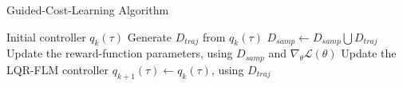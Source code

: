 \begin{algorithm}[htbp]
\caption{Guided-Cost-Learning Algorithm \cite{finn2016guided_cost_learning}}
\label{alg:guided_cost_learning}
\begin{algorithmic}
\Require Initial controller $q_{k}(\tau)$ 
    \State Generate $D_{traj}$ from $q_{k}(\tau)$
    \State $D_{samp} \leftarrow D_{samp} \bigcup D_{traj}$
    \State Update the reward-function parameters, using $D_{samp}$ and $\nabla_{\theta}\mathcal{L(\theta)}$
    \State Update the LQR-FLM \cite{levine2014lqr_flm} controller $q_{k+1}(\tau) \leftarrow q_{k}(\tau)$, using $D_{traj}$
\EndFor
\end{algorithmic}
\end{algorithm}